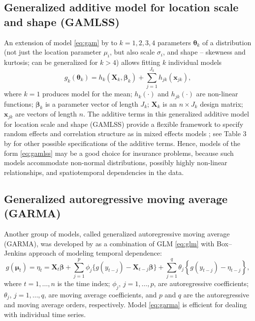 \documentclass[
]{book}
\begin{document}
\hypertarget{generalized-additive-model-for-location-scale-and-shape-gamlss}{%
\subsection{Generalized additive model for location scale and shape (GAMLSS)}\label{generalized-additive-model-for-location-scale-and-shape-gamlss}}

An extension of model \eqref{eq:gam} by \citet{Stasinopoulos:Rigby:2007} to \(k=1,2,3,4\) parameters \(\boldsymbol{\theta}_k\) of a distribution (not just the location parameter \(\mu_i\), but also scale \(\sigma_i\), and shape -- skewness and kurtosis; can be generalized for \(k>4\)) allows fitting \(k\) individual models
\begin{equation}
   \label{eq:gamlss}
    g_k(\boldsymbol{\theta}_k) = h_k\left(\mathbf{X}_k,\boldsymbol{\beta}_k\right) + \sum_{j=1}^{J_k}h_{jk}(\mathbf{x}_{jk}),
\end{equation}
where \(k=1\) produces model for the mean; \(h_k(\cdot)\) and \(h_{jk}(\cdot)\) are non-linear functions; \(\boldsymbol{\beta}_k\) is a parameter vector of length \(J_k\); \(\mathbf{X}_k\) is an \(n\times J_k\) design matrix; \(\mathbf{x}_{jk}\) are vectors of length \(n\). The additive terms in this generalized additive model for location scale and shape (GAMLSS) provide a flexible framework to specify random effects and correlation structure as in mixed effects models \citep{Zuur:etal:2009}; see Table 3 by \citet{Stasinopoulos:Rigby:2007} for other possible specifications of the additive terms. Hence, models of the form \eqref{eq:gamlss} may be a good choice for insurance problems, because such models accommodate non-normal distributions, possibly highly non-linear relationships, and spatiotemporal dependencies in the data.

\hypertarget{generalized-autoregressive-moving-average-garma}{%
\subsection{Generalized autoregressive moving average (GARMA)}\label{generalized-autoregressive-moving-average-garma}}

Another group of models, called generalized autoregressive moving average (GARMA), was developed by \citet{Benjamin:etal:2003} as a combination of GLM \eqref{eq:glm} with Box--Jenkins approach of modeling temporal dependence:
\begin{equation}
    \label{eq:garma}
    g(\boldsymbol{\mu}_t) = \eta_t = \mathbf{X}_t\boldsymbol{\beta} + \sum_{j=1}^p{\phi_j \{ g(y_{t-j}) - \mathbf{X}_{t-j}\boldsymbol{\beta}\}} + \sum_{j=1}^q \theta_j \left\{ g(y_{t-j}) - \eta_{t-j}\right\},
\end{equation}
where \(t=1,\ldots,n\) is the time index; \(\phi_j\), \(j=1,\ldots,p\), are autoregressive coefficients; \(\theta_j\), \(j=1,\ldots,q\), are moving average coefficients, and \(p\) and \(q\) are the autoregressive and moving average orders, respectively. Model \eqref{eq:garma} is efficient for dealing with individual time series.
\end{document}
